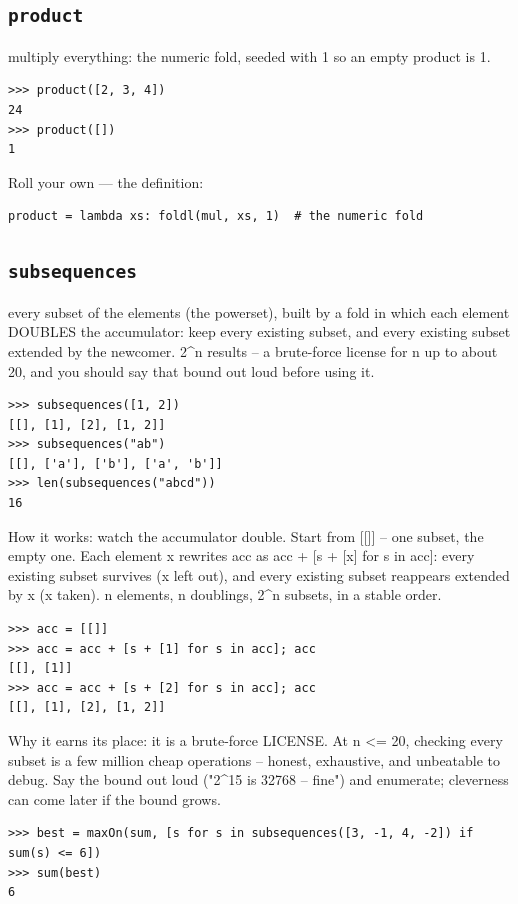 \documentclass[10pt,letterpaper]{book}
\begin{document}
\subsection{\texttt{product}}\label{def:product}
multiply everything: the numeric fold, seeded with 1 so an empty product is 1.
\begin{lstlisting}[style=ex]
>>> product([2, 3, 4])
24
>>> product([])
1
\end{lstlisting}

Roll your own --- the definition:

\begin{lstlisting}[style=ex]
product = lambda xs: foldl(mul, xs, 1)  # the numeric fold
\end{lstlisting}
\subsection{\texttt{subsequences}}\label{def:subsequences}
every subset of the elements (the powerset), built by a fold in which each element DOUBLES the accumulator: keep every existing subset, and every existing subset extended by the newcomer. 2\^{}n results -- a brute-force license for n up to about 20, and you should say that bound out loud before using it.
\begin{lstlisting}[style=ex]
>>> subsequences([1, 2])
[[], [1], [2], [1, 2]]
>>> subsequences("ab")
[[], ['a'], ['b'], ['a', 'b']]
>>> len(subsequences("abcd"))
16
\end{lstlisting}

How it works: watch the accumulator double. Start from [[]] -- one subset, the empty one. Each element x rewrites acc as acc + [s + [x] for s in acc]: every existing subset survives (x left out), and every existing subset reappears extended by x (x taken). n elements, n doublings, 2\^{}n subsets, in a stable order.

\begin{lstlisting}[style=ex]
>>> acc = [[]]
>>> acc = acc + [s + [1] for s in acc]; acc
[[], [1]]
>>> acc = acc + [s + [2] for s in acc]; acc
[[], [1], [2], [1, 2]]
\end{lstlisting}

Why it earns its place: it is a brute-force LICENSE. At n <= 20, checking every subset is a few million cheap operations -- honest, exhaustive, and unbeatable to debug. Say the bound out loud ("2\^{}15 is 32768 -- fine") and enumerate; cleverness can come later if the bound grows.

\begin{lstlisting}[style=ex]
>>> best = maxOn(sum, [s for s in subsequences([3, -1, 4, -2]) if sum(s) <= 6])
>>> sum(best)
6
\end{lstlisting}
\end{document}
